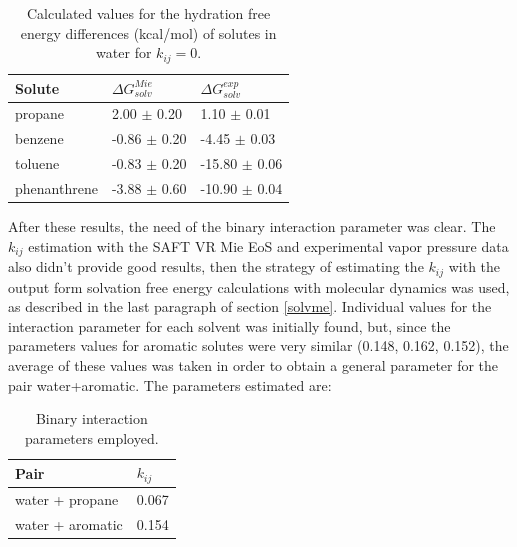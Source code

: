 \FloatBarrier
\begin{table}[h]
	\centering
	\caption{Calculated values for the hydration free energy differences (kcal/mol) of solutes in water for $k_{ij}=0$.}
	\label{tbl:solv3}
	\begin{tabular}{lll}
		\hline
		Solute & $\Delta G_{solv}^{Mie}$ & $\Delta G_{solv}^{exp}$ \\
		\hline
		propane   & 2.00 $\pm$ 0.20&1.10 $\pm$ 0.01   \\
		benzene  & -0.86 $\pm$ 0.20 & -4.45 $\pm$ 0.03   \\
		toluene  & -0.83 $\pm$ 0.20 &-15.80 $\pm$ 0.06   \\
		phenanthrene & -3.88 $\pm$ 0.60 &-10.90 $\pm$ 0.04   \\
		\hline
	\end{tabular}
\end{table}
\FloatBarrier

After these results, the need of  the binary interaction parameter was clear. The $k_{ij}$ estimation with the SAFT VR Mie EoS and experimental vapor pressure data also didn't provide good results, then the strategy of estimating the $k_{ij}$ with the output form solvation free energy calculations with molecular dynamics was used, as described in the last paragraph of section \ref{solvme}.  Individual values for the interaction parameter for each solvent was initially found, but, since the parameters values for aromatic solutes were very similar (0.148, 0.162, 0.152), the average of these values was taken in order to obtain a general parameter for the pair water+aromatic. The parameters estimated are:

\begin{table}[h]
  \centering
  \caption{Binary interaction parameters employed.}
  \label{tbl:kij}
  \begin{tabular}{ll}
    \hline
      Pair & $k_{ij}$ \\
    \hline
    water  + propane      & 0.067  \\
    water  + aromatic      & 0.154 \\  
    \hline
  \end{tabular}
\end{table}

